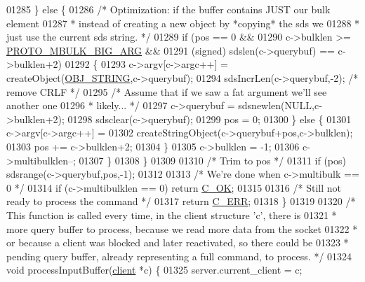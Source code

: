 \begin{DoxyCode}
{{{{{{{{{{{{{{{01285         \} \textcolor{keywordflow}{else} \{
01286             \textcolor{comment}{/* Optimization: if the buffer contains JUST our bulk element}
01287 \textcolor{comment}{             * instead of creating a new object by *copying* the sds we}
01288 \textcolor{comment}{             * just use the current sds string. */}
01289             \textcolor{keywordflow}{if} (pos == 0 &&
01290                 c->bulklen >= \hyperlink{server_8h_afb6bccf6f1ac66b1d563330ab499fb32}{PROTO\_MBULK\_BIG\_ARG} &&
01291                 (\textcolor{keywordtype}{signed}) sdslen(c->querybuf) == c->bulklen+2)
01292             \{
01293                 c->argv[c->argc++] = createObject(\hyperlink{server_8h_a65236ea160f69cdef33ec942092af88f}{OBJ\_STRING},c->querybuf);
01294                 sdsIncrLen(c->querybuf,-2); \textcolor{comment}{/* remove CRLF */}
01295                 \textcolor{comment}{/* Assume that if we saw a fat argument we'll see another one}
01296 \textcolor{comment}{                 * likely... */}
01297                 c->querybuf = sdsnewlen(NULL,c->bulklen+2);
01298                 sdsclear(c->querybuf);
01299                 pos = 0;
01300             \} \textcolor{keywordflow}{else} \{
01301                 c->argv[c->argc++] =
01302                     createStringObject(c->querybuf+pos,c->bulklen);
01303                 pos += c->bulklen+2;
01304             \}
01305             c->bulklen = -1;
01306             c->multibulklen--;
01307         \}
01308     \}
01309 
01310     \textcolor{comment}{/* Trim to pos */}
01311     \textcolor{keywordflow}{if} (pos) sdsrange(c->querybuf,pos,-1);
01312 
01313     \textcolor{comment}{/* We're done when c->multibulk == 0 */}
01314     \textcolor{keywordflow}{if} (c->multibulklen == 0) \textcolor{keywordflow}{return} \hyperlink{server_8h_a303769ef1065076e68731584e758d3e1}{C\_OK};
01315 
01316     \textcolor{comment}{/* Still not ready to process the command */}
01317     \textcolor{keywordflow}{return} \hyperlink{server_8h_af98ac28d5f4d23d7ed5985188e6fb7d1}{C\_ERR};
01318 \}
01319 
01320 \textcolor{comment}{/* This function is called every time, in the client structure 'c', there is}
01321 \textcolor{comment}{ * more query buffer to process, because we read more data from the socket}
01322 \textcolor{comment}{ * or because a client was blocked and later reactivated, so there could be}
01323 \textcolor{comment}{ * pending query buffer, already representing a full command, to process. */}
01324 \textcolor{keywordtype}{void} processInputBuffer(\hyperlink{structclient}{client} *c) \{
01325     server.current\_client = c;
}}}}}}}}}}}}}}}
\end{DoxyCode}
